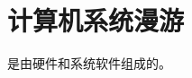 
\chapter{计算机系统漫游}
{
    是由硬件和系统软件组成的。

    
    
    
    
    
    
    
    
    
}

\cleardoublepage

\endinput
